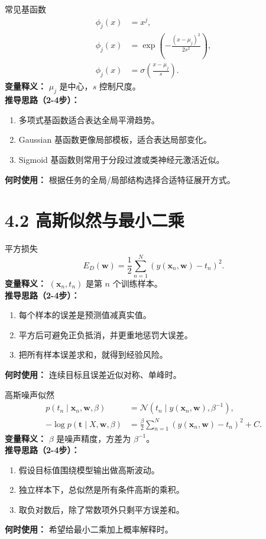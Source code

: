﻿\documentclass[11pt]{article}
\begin{document}
\begin{formulabox}{常见基函数}
\begin{align}
\phi_j(x)&=x^j,\\
\phi_j(x)&=\exp\left(-\frac{(x-\mu_j)^2}{2s^2}\right),\\
\phi_j(x)&=\sigma\left(\frac{x-\mu_j}{s}\right).
\end{align}
\textbf{变量释义：} $\mu_j$ 是中心，$s$ 控制尺度。\\
\textbf{推导思路（2-4步）：}
\begin{enumerate}[leftmargin=1.6em]
  \item 多项式基函数适合表达全局平滑趋势。
  \item Gaussian 基函数更像局部模板，适合表达局部变化。
  \item Sigmoid 基函数则常用于分段过渡或类神经元激活近似。
\end{enumerate}
\textbf{何时使用：} 根据任务的全局/局部结构选择合适特征展开方式。
\end{formulabox}

\section{4.2 高斯似然与最小二乘}
\begin{formulabox}{平方损失}
\begin{equation}
E_D(\mathbf w)=\frac12\sum_{n=1}^{N}\left(y(\mathbf x_n,\mathbf w)-t_n\right)^2.
\end{equation}
\textbf{变量释义：} $(\mathbf x_n,t_n)$ 是第 $n$ 个训练样本。\\
\textbf{推导思路（2-4步）：}
\begin{enumerate}[leftmargin=1.6em]
  \item 每个样本的误差是预测值减真实值。
  \item 平方后可避免正负抵消，并更重地惩罚大误差。
  \item 把所有样本误差求和，就得到经验风险。
\end{enumerate}
\textbf{何时使用：} 连续目标且误差近似对称、单峰时。
\end{formulabox}

\begin{formulabox}{高斯噪声似然}
\begin{align}
p(t_n\mid \mathbf x_n,\mathbf w,\beta)&=\mathcal N\left(t_n\mid y(\mathbf x_n,\mathbf w),\beta^{-1}\right),\\
-\log p(\mathbf t\mid X,\mathbf w,\beta)&=\frac{\beta}{2}\sum_{n=1}^{N}\left(y(\mathbf x_n,\mathbf w)-t_n\right)^2+C.
\end{align}
\textbf{变量释义：} $\beta$ 是噪声精度，方差为 $\beta^{-1}$。\\
\textbf{推导思路（2-4步）：}
\begin{enumerate}[leftmargin=1.6em]
  \item 假设目标值围绕模型输出做高斯波动。
  \item 独立样本下，总似然是所有条件高斯的乘积。
  \item 取负对数后，除了常数项外只剩平方误差和。
\end{enumerate}
\textbf{何时使用：} 希望给最小二乘加上概率解释时。
\end{formulabox}
\end{document}
